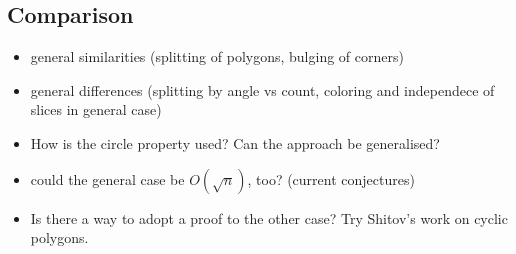 \subsection{Comparison}

\begin{itemize}
  \item general similarities (splitting of polygons, bulging of corners)
  \item general differences (splitting by angle vs count, coloring and independece of slices in general case)
  \item How is the circle property used? Can the approach be generalised?
  \item could the general case be $O(\sqrt{n})$, too? (current conjectures)
  \item Is there a way to adopt a proof to the other case? Try Shitov's work on cyclic polygons.
\end{itemize}
